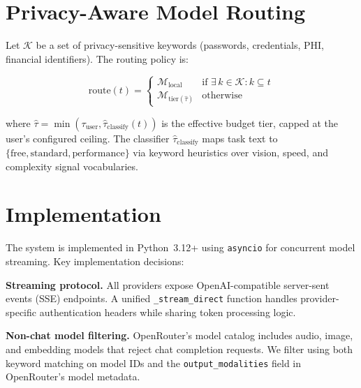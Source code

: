 \documentclass[11pt,twocolumn]{article}
\begin{document}
\section{Privacy-Aware Model Routing}
\label{sec:privacy}

Let $\mathcal{K}$ be a set of privacy-sensitive keywords (passwords, credentials,
PHI, financial identifiers). The routing policy is:

\begin{equation}
  \text{route}(t) = \begin{cases}
    \mathcal{M}_{\text{local}} & \text{if } \exists\, k \in \mathcal{K} : k \subseteq t \\
    \mathcal{M}_{\text{tier}(\hat{\tau})} & \text{otherwise}
  \end{cases}
\end{equation}

where $\hat{\tau} = \min(\tau_{\text{user}}, \hat{\tau}_{\text{classify}}(t))$ is
the effective budget tier, capped at the user's configured ceiling. The classifier
$\hat{\tau}_{\text{classify}}$ maps task text to $\{\text{free}, \text{standard},
\text{performance}\}$ via keyword heuristics over vision, speed, and complexity
signal vocabularies.

\section{Implementation}
\label{sec:impl}

The system is implemented in Python~3.12+ using \texttt{asyncio} for concurrent
model streaming. Key implementation decisions:

\textbf{Streaming protocol.} All providers expose OpenAI-compatible server-sent
events (SSE) endpoints. A unified \texttt{\_stream\_direct} function handles
provider-specific authentication headers while sharing token processing logic.

\textbf{Non-chat model filtering.} OpenRouter's model catalog includes audio, image,
and embedding models that reject chat completion requests. We filter using both
keyword matching on model IDs and the \texttt{output\_modalities} field in
OpenRouter's model metadata.
\end{document}
